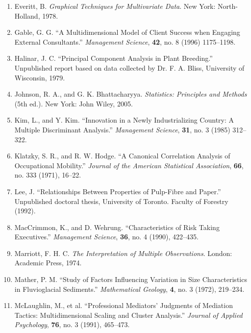 \begin{enumerate}
\item Everitt, B. \textit{Graphical Techniques for Multivariate Data}. New York: North-Holland, 1978.

\item Gable, G. G. ``A Multidimensional Model of Client Success when Engaging External Consultants.'' \textit{Management Science}, \textbf{42}, no. 8 (1996) 1175--1198.

\item Halinar, J. C. ``Principal Component Analysis in Plant Breeding.'' Unpublished report based on data collected by Dr. F. A. Bliss, University of Wisconsin, 1979.

\item Johnson, R. A., and G. K. Bhattacharyya. \textit{Statistics: Principles and Methods} (5th ed.). New York: John Wiley, 2005.

\item Kim, L., and Y. Kim. ``Innovation in a Newly Industrializing Country: A Multiple Discriminant Analysis.'' \textit{Management Science}, \textbf{31}, no. 3 (1985) 312--322.

\item Klatzky, S. R., and R. W. Hodge. ``A Canonical Correlation Analysis of Occupational Mobility.'' \textit{Journal of the American Statistical Association}, \textbf{66}, no. 333 (1971), 16--22.

\item Lee, J. ``Relationships Between Properties of Pulp-Fibre and Paper.'' Unpublished doctoral thesis, University of Toronto. Faculty of Forestry (1992).

\item MacCrimmon, K., and D. Wehrung. ``Characteristics of Risk Taking Executives.'' \textit{Management Science}, \textbf{36}, no. 4 (1990), 422--435.

\item Marriott, F. H. C. \textit{The Interpretation of Multiple Observations}. London: Academic Press, 1974.

\item Mather, P. M. ``Study of Factors Influencing Variation in Size Characteristics in Fluvioglacial Sediments.'' \textit{Mathematical Geology}, \textbf{4}, no. 3 (1972), 219--234.

\item McLaughlin, M., et al. ``Professional Mediators' Judgments of Mediation Tactics: Multidimensional Scaling and Cluster Analysis.'' \textit{Journal of Applied Psychology}, \textbf{76}, no. 3 (1991), 465--473.
\end{enumerate}
